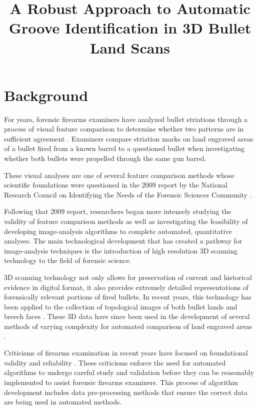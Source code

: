 \documentclass[]{article}
\title{A Robust Approach to Automatic Groove Identification in 3D Bullet Land
Scans}
\author{}
\date{}
\begin{document}
\maketitle

\section{Background}

For years, forensic firearms examiners have analyzed bullet striations
through a process of visual feature comparison to determine whether two
patterns are in sufficient agreement \citep{AFTE}. Examiners compare
striation marks on land engraved areas of a bullet fired from a known
barrel to a questioned bullet when investigating whether both bullets
were propelled through the same gun barrel.

These visual analyses are one of several feature comparison methods
whose scientific foundations were questioned in the 2009 report by the
National Research Council on Identifying the Needs of the Forensic
Sciences Community \citep{NRC2009}.

Following that 2009 report, researchers began more intensely studying
the validity of feature comparison methods as well as investigating the
feasibility of developing image-analysis algorithms to complete
automated, quantitative analyses. The main technological development
that has created a pathway for image-analysis techniques is the
introduction of high resolution 3D scanning technology to the field of
forensic science.

3D scanning technology not only allows for preservation of current and
historical evidence in digital format, it also provides extremely
detailed representations of forensically relevant portions of fired
bullets. In recent years, this technology has been applied to the
collection of topological images of both bullet lands and breech faces
\citep[e.g.][]{DeKinder1, DeKinder2, Bachrach1}. These 3D data have
since been used in the development of several methods of varying
complexity for automated comparison of land engraved areas
\citep[e.g.][]{Ma1, Chu1, Chu2, Hare1}.

Criticisms of firearms examination in recent years have focused on
foundational validity and reliability \citep[e.g.][]{PCAST2016}. These
criticisms enforce the need for automated algorithms to undergo careful
study and validation before they can be reasonably implemented to assist
forensic firearms examiners. This process of algorithm development
includes data pre-processing methods that ensure the correct data are
being used in automated methods.
\end{document}
